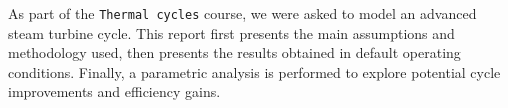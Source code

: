 As part of the \texttt{Thermal cycles} course, we were asked to model an advanced steam turbine cycle. 
This report first presents the main assumptions and methodology used, 
then presents the results obtained in default operating conditions.
Finally, a parametric analysis is performed to explore potential cycle improvements and efficiency gains.